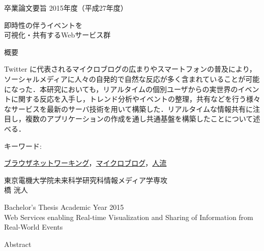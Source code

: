 \newpage
\pagestyle{plain}
\begin{center}
\LARGE{卒業論文要旨 \hspace{10mm} 2015年度（平成27年度）}\\

\vspace{10mm}

\LARGE{即時性の伴うイベントを\\可視化・共有するWebサービス群}\\
\end{center}

\begin{center}
概要\\
\end{center}

Twitter に代表されるマイクロブログの広まりやスマートフォンの普及により，ソーシャルメディアに人々の自発的で自然な反応が多く含まれていることが可能になった．本研究においても，リアルタイムの個別ユーザからの実世界のイベントに関する反応を入手し，トレンド分析やイベントの整理，共有などを行う様々なサービスを最新のサーバ技術を用いて構築した．リアルタイムな情報共有に注目し，複数のアプリケーションの作成を通し共通基盤を構築したことについて述べる．

\begin{flushleft}キーワード:\\
\end{flushleft}
{\underline{ブラウザネットワーキング}，\underline{マイクロブログ}，\underline{人流}}


\begin{center}
\vspace{10mm}
\begin{flushright}\large 東京電機大学院未来科学研究科情報メディア学専攻\\
\LARGE {}橋 洸人\\
\end{flushright}
\end{center}

\newpage

\begin{center}
\LARGE{Bachelor's Thesis Academic Year 2015}\\

\vspace{10mm}
\LARGE{Web Services enabling Real-time Visualization and Sharing of Information from Real-World Events}\\
\end{center}
\begin{center}
Abstract\\
\end{center}

